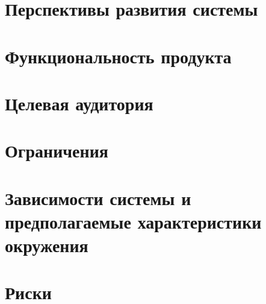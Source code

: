 \section{Перспективы развития системы}


\section{Функциональность продукта}


\section{Целевая аудитория}


\section{Ограничения}


\section{Зависимости системы и предполагаемые характеристики окружения}  


\section{Риски}



